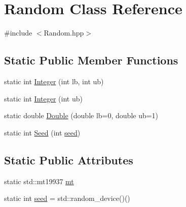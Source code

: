 \hypertarget{class_random}{\section{Random Class Reference}
\label{class_random}
}


{\ttfamily \#include $<$Random.\-hpp$>$}

\subsection*{Static Public Member Functions}
\begin{DoxyCompactItemize}
\item 
static int \hyperlink{class_random_aa56a13c81680b43082ff2c29c2488212}{Integer} (int lb, int ub)
\item 
static int \hyperlink{class_random_afd2386359635f5e79df7108bdf288c86}{Integer} (int ub)
\item 
static double \hyperlink{class_random_a913483b8b2d33a4b8aa60b64749ed434}{Double} (double lb=0, double ub=1)
\item 
static int \hyperlink{class_random_a032603d2d9246b9d5f140fb8ba03276e}{Seed} (int \hyperlink{class_random_a046dccc4dc6055ffd3e90d597beb8620}{seed})
\end{DoxyCompactItemize}
\subsection*{Static Public Attributes}
\begin{DoxyCompactItemize}
\item 
static std\-::mt19937 \hyperlink{class_random_aa4354db31fa7d64040939b905ab12ee1}{mt}
\item 
static int \hyperlink{class_random_a046dccc4dc6055ffd3e90d597beb8620}{seed} = std\-::random\-\_\-device()()
\end{DoxyCompactItemize}


